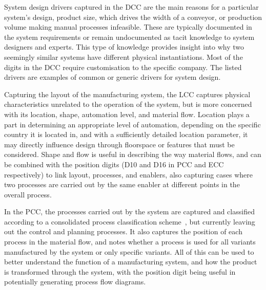 System design drivers captured in the DCC are the main reasons for a particular system's design, \eg{} product size, which drives the width of a conveyor, or production volume making manual processes infeasible.
These are typically documented in the system requirements or remain undocumented as tacit knowledge to system designers and experts.
This type of knowledge provides insight into why two seemingly similar systems have different physical instantiations.
Most of the digits in the DCC require customisation to the specific company.
The listed drivers are examples of common or generic drivers for system design.

Capturing the layout of the manufacturing system, the LCC captures physical characteristics unrelated to the operation of the system, but is more concerned with its location, shape, automation level, and material flow.
Location plays a part in determining an appropriate level of automation, depending on the specific country it is located in, and with a sufficiently detailed location parameter, it may directly influence design through floorspace or features that must be considered. 
Shape and flow is useful in describing the way material flows, and can be combined with the position digits (D10 and D16 in PCC and ECC respectively) to link layout, processes, and enablers, also capturing cases where two processes are carried out by the same enabler at different points in the overall process.

In the PCC, the processes carried out by the system are captured and classified according to a consolidated process classification scheme~\parencite{SorensenCMS2018}, but currently leaving out the control and planning processes.
It also captures the position of each process in the material flow, and notes whether a process is used for all variants manufactured by the system or only specific variants.
All of this can be used to better understand the function of a manufacturing system, and how the product is transformed through the system, with the position digit being useful in potentially generating process flow diagrams.


